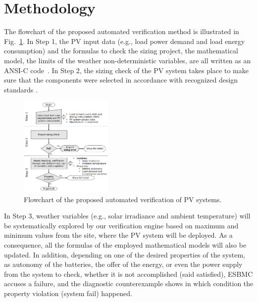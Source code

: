 \documentclass[journal]{IEEEtran}
\begin{document}
\section{Methodology }
\label{sec:Methodology}
%
%
%
%
The flowchart of the proposed automated verification method is illustrated in Fig.~\ref{fig:flowchartgeneral}. 
In Step 1, the PV input data (e.g., load power demand and load energy consumption) and the formulas to check the sizing project, the mathematical model, the limits of the weather non-deterministic variables, are all written as an ANSI-C code~\cite{ANSI2018}. In Step 2, the sizing check of the PV system takes place to make sure that the components were selected in accordance with recognized design standards \cite{Pinho}.
\begin{figure}[h]
\includegraphics[width=0.4\textwidth]{flowchart_verification4.png}
\centering
\caption{Flowchart of the proposed automated verification of PV systems.}
\label{fig:flowchartgeneral}
\end{figure}
%
In Step 3, weather variables (e.g., solar irradiance and ambient temperature) will be systematically explored by our verification engine based on maximum and minimum values from the site, where the PV system will be deployed. As a consequence, all the formulas of the employed mathematical models will also be updated. In addition, depending on one of the desired properties of the system, as autonomy of the batteries, the offer of the energy, or even the power supply from the system to check, whether it is not accomplished (said satisfied), ESBMC accuses a failure, and the diagnostic counterexample shows in which condition the property violation (system fail) happened. 
\end{document}
